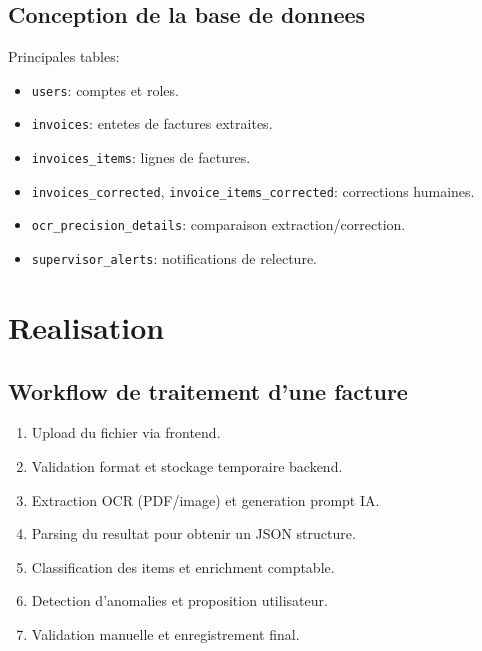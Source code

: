 \documentclass[12pt,a4paper]{report}
\begin{document}
\section{Conception de la base de donnees}
Principales tables:
\begin{itemize}
    \item \texttt{users}: comptes et roles.
    \item \texttt{invoices}: entetes de factures extraites.
    \item \texttt{invoices\_items}: lignes de factures.
    \item \texttt{invoices\_corrected}, \texttt{invoice\_items\_corrected}: corrections humaines.
    \item \texttt{ocr\_precision\_details}: comparaison extraction/correction.
    \item \texttt{supervisor\_alerts}: notifications de relecture.
\end{itemize}

\chapter{Realisation}
\section{Workflow de traitement d'une facture}
\begin{enumerate}
    \item Upload du fichier via frontend.
    \item Validation format et stockage temporaire backend.
    \item Extraction OCR (PDF/image) et generation prompt IA.
    \item Parsing du resultat pour obtenir un JSON structure.
    \item Classification des items et enrichment comptable.
    \item Detection d'anomalies et proposition utilisateur.
    \item Validation manuelle et enregistrement final.
\end{enumerate}
\end{document}
